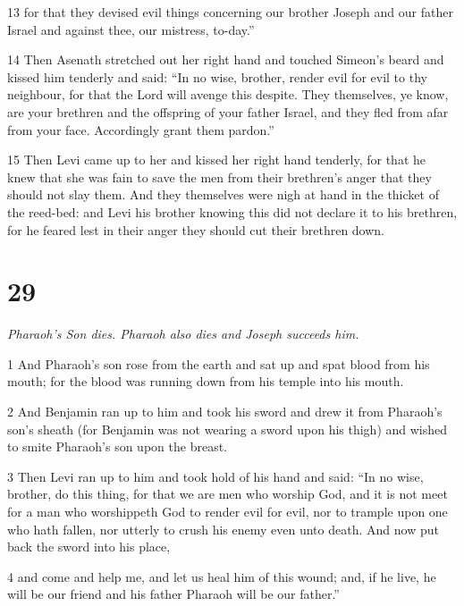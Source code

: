 \par 13 for that they devised evil things concerning our brother Joseph and our father Israel and against thee, our mistress, to-day.” 

\par 14 Then Asenath stretched out her right hand and touched Simeon's beard and kissed him tenderly and said: “In no wise, brother, render evil for evil to thy neighbour, for that the Lord will avenge this despite. They themselves, ye know, are your brethren and the offspring of your father Israel, and they fled from afar from your face. Accordingly grant them pardon.” 

\par 15 Then Levi came up to her and kissed her right hand tenderly, for that he knew that she was fain to save the men from their brethren's anger that they should not slay them. And they themselves were nigh at hand in the thicket of the reed-bed: and Levi his brother knowing this did not declare it to his brethren, for he feared lest in their anger they should cut their brethren down. 

\chapter{29}

\par \textit{Pharaoh's Son dies. Pharaoh also dies and Joseph succeeds him.}

\par 1 And Pharaoh's son rose from the earth and sat up and spat blood from his mouth; for the blood was running down from his temple into his mouth. 

\par 2 And Benjamin ran up to him and took his sword and drew it from Pharaoh's son's sheath (for Benjamin was not wearing a sword upon his thigh) and wished to smite Pharaoh's son upon the breast. 

\par 3 Then Levi ran up to him and took hold of his hand and said: “In no wise, brother, do this thing, for that we are men who worship God, and it is not meet for a man who worshippeth God to render evil for evil, nor to trample upon one who hath fallen, nor utterly to crush his enemy even unto death. And now put back the sword into his place, 

\par 4 and come and help me, and let us heal him of this wound; and, if he live, he will be our friend and his father Pharaoh will be our father.” 

